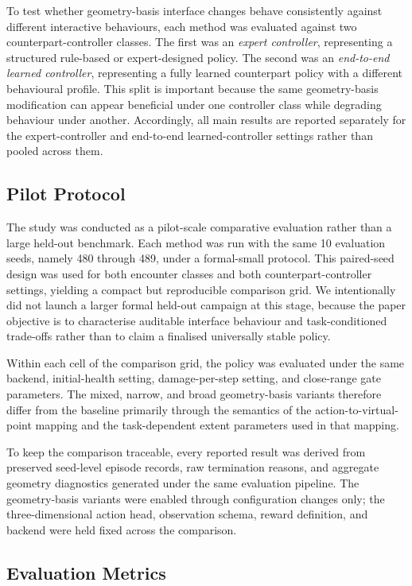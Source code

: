 \documentclass[drones,article,submit,pdftex,moreauthors]{Definitions/mdpi}
\begin{document}
To test whether geometry-basis interface changes behave consistently against different interactive behaviours, each method was evaluated against two counterpart-controller classes. The first was an \emph{expert controller}, representing a structured rule-based or expert-designed policy. The second was an \emph{end-to-end learned controller}, representing a fully learned counterpart policy with a different behavioural profile. This split is important because the same geometry-basis modification can appear beneficial under one controller class while degrading behaviour under another. Accordingly, all main results are reported separately for the expert-controller and end-to-end learned-controller settings rather than pooled across them.

\subsection{Pilot Protocol}

The study was conducted as a pilot-scale comparative evaluation rather than a large held-out benchmark. Each method was run with the same 10 evaluation seeds, namely 480 through 489, under a formal-small protocol. This paired-seed design was used for both encounter classes and both counterpart-controller settings, yielding a compact but reproducible comparison grid. We intentionally did not launch a larger formal held-out campaign at this stage, because the paper objective is to characterise auditable interface behaviour and task-conditioned trade-offs rather than to claim a finalised universally stable policy.

Within each cell of the comparison grid, the policy was evaluated under the same backend, initial-health setting, damage-per-step setting, and close-range gate parameters. The mixed, narrow, and broad geometry-basis variants therefore differ from the baseline primarily through the semantics of the action-to-virtual-point mapping and the task-dependent extent parameters used in that mapping.

To keep the comparison traceable, every reported result was derived from preserved seed-level episode records, raw termination reasons, and aggregate geometry diagnostics generated under the same evaluation pipeline. The geometry-basis variants were enabled through configuration changes only; the three-dimensional action head, observation schema, reward definition, and backend were held fixed across the comparison.

\subsection{Evaluation Metrics}
\end{document}

